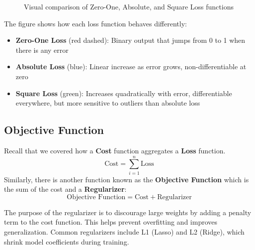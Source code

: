 \begin{figure}[h]
\centering
{}
\caption{Visual comparison of Zero-One, Absolute, and Square Loss functions}
\label{fig:loss-comparison}
\end{figure}

The figure shows how each loss function behaves differently:
\begin{itemize}
    \item \textbf{Zero-One Loss} (red dashed): Binary output that jumps from 0 to 1 when there is any error
    \item \textbf{Absolute Loss} (blue): Linear increase as error grows, non-differentiable at zero
    \item \textbf{Square Loss} (green): Increases quadratically with error, differentiable everywhere, but more sensitive to outliers than absolute loss
\end{itemize}

\subsection{Objective Function}
Recall that we covered how a \textbf{Cost} function aggregates a \textbf{Loss} function.
\[ 
\text{Cost} = \sum_{i=1}^{n} \text{Loss}
\]
Similarly, there is another function known as the \textbf{Objective Function} which is the sum of the cost and a \textbf{Regularizer}:
\[ 
\text{Objective Function} = \text{Cost} + \text{Regularizer}
\]

The purpose of the regularizer is to discourage large weights by adding a penalty term to the cost function. This helps prevent overfitting and improves generalization. Common regularizers include L1 (Lasso) \cite{tibshirani1996lasso} and L2 (Ridge), which shrink model coefficients during training.

